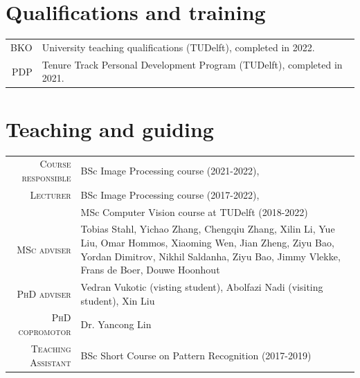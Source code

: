 \documentclass[a4paper, oneside, final]{scrartcl}
\begin{document}
\begin{center}
		\section{Qualifications and training}
		\begin{tabular}{r@{\hskip 0.3in}p{12.3cm}}
            \textsc{BKO}                   & University teaching qualifications (TUDelft), completed in 2022.\\
            \textsc{PDP}                   & Tenure Track Personal Development Program (TUDelft), completed in 2021.\\
		\end{tabular}
		\section{Teaching and guiding}
		\begin{tabular}{r@{\hskip 0.3in}p{12.3cm}}
			\textsc{Course responsible}		    & BSc Image Processing course (2021-2022),\\
			\textsc{Lecturer}		            & BSc Image Processing course (2017-2022),\\
                                                & MSc Computer Vision course at TUDelft (2018-2022)\\
			\textsc{MSc adviser}                & Tobias Stahl, Yichao Zhang, Chengqiu Zhang, Xilin Li, Yue Liu, Omar Hommos, Xiaoming Wen, Jian Zheng, Ziyu Bao, Yordan Dimitrov, Nikhil Saldanha, Ziyu Bao, Jimmy Vlekke, Frans de Boer, Douwe Hoonhout\\
			\textsc{PhD adviser}                & Vedran Vukotic (visting student), Abolfazi Nadi (visiting student), Xin Liu\\ 
			\textsc{PhD copromotor}             & Dr. Yancong Lin\\ 
            \textsc{Teaching Assistant}         & BSc Short Course on Pattern Recognition (2017-2019)\\
		\end{tabular}

\end{center}
\end{document}

